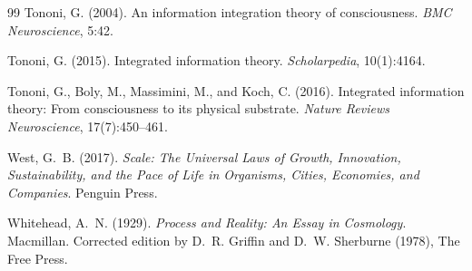 \documentclass[12pt,a4paper]{article}
\begin{document}
\begin{thebibliography}{99}
Tononi, G. (2004).
\newblock An information integration theory of consciousness.
\newblock \emph{BMC Neuroscience}, 5:42.

Tononi, G. (2015).
\newblock Integrated information theory.
\newblock \emph{Scholarpedia}, 10(1):4164.

Tononi, G., Boly, M., Massimini, M., and Koch, C. (2016).
\newblock Integrated information theory: From consciousness to its
  physical substrate.
\newblock \emph{Nature Reviews Neuroscience}, 17(7):450--461.

West, G.~B. (2017).
\newblock \emph{Scale: The Universal Laws of Growth, Innovation,
  Sustainability, and the Pace of Life in Organisms, Cities, Economies,
  and Companies}.
\newblock Penguin Press.

Whitehead, A.~N. (1929).
\newblock \emph{Process and Reality: An Essay in Cosmology}.
\newblock Macmillan. Corrected edition by D.~R. Griffin and D.~W.
  Sherburne (1978), The Free Press.

\end{thebibliography}
\end{document}
